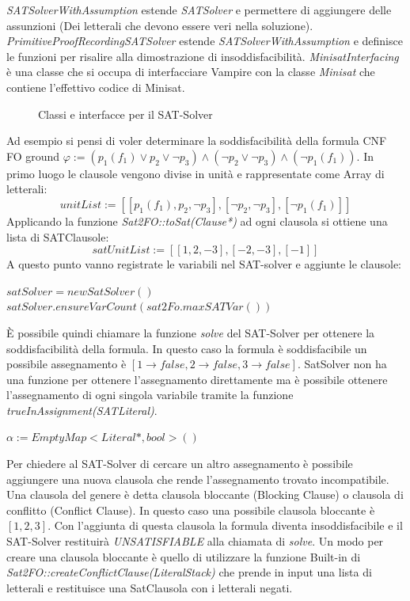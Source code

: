 \documentclass[./main.tex]{subfiles}
\begin{document}
\textit{SATSolverWithAssumption} estende \textit{SATSolver} e permettere di aggiungere delle assunzioni (Dei letterali che devono essere veri nella soluzione).
\textit{PrimitiveProofRecordingSATSolver} estende \textit{SATSolverWithAssumption} e definisce le funzioni per risalire alla dimostrazione di insoddisfacibilità.
\textit{MinisatInterfacing} è una classe che si occupa di interfacciare Vampire con la classe \textit{Minisat} che contiene
l'effettivo codice di Minisat.

\begin{figure}[h]
    \centering
    \scalebox{0.5}{
        
    }
    \caption{Classi e interfacce per il SAT-Solver}
    \label{fig:vampire_sat_solver}
\end{figure}

Ad esempio si pensi di voler determinare la soddisfacibilità della formula CNF FO ground 
$\varphi := (p_1(f_1) \lor p_2 \lor \lnot p_3) \land (\lnot p_2 \lor \lnot p_3) \land (\lnot p_1(f_1))$.
In primo luogo le clausole vengono divise in unità e rappresentate come Array di letterali:
$$unitList := [[p_1(f_1), p_2, \lnot p_3], [\lnot p_2, \lnot p_3], [\lnot p_1(f_1)]]$$
Applicando la funzione \textit{Sat2FO::toSat(Clause*)} ad ogni clausola si ottiene una lista di SATClausole:
$$satUnitList := [[1, 2, -3], [-2, -3], [-1]]$$
A questo punto vanno registrate le variabili nel SAT-solver e aggiunte le clausole:

$satSolver = new SatSolver()$ \\
$satSolver.ensureVarCount(sat2Fo.maxSATVar())$ \\

È possibile quindi chiamare la funzione \textit{solve} del SAT-Solver per ottenere la soddisfacibilità della formula.
In questo caso la formula è soddisfacibile un possibile assegnamento è $[1{\rightarrow}false, 2{\rightarrow}false, 3{\rightarrow}false]$.
SatSolver non ha una funzione per ottenere l'assegnamento direttamente ma è possibile ottenere l'assegnamento di ogni singola variabile
tramite la funzione \textit{trueInAssignment(SATLiteral)}.

$\alpha := EmptyMap<Literal*, bool>()$ \\


Per chiedere al SAT-Solver di cercare un altro assegnamento è possibile aggiungere una nuova clausola 
che rende l'assegnamento trovato incompatibile. Una clausola del genere è detta clausola bloccante (Blocking Clause) o clausola di conflitto (Conflict Clause).
In questo caso una possibile clausola bloccante è $[1,2,3]$. 
Con l'aggiunta di questa clausola la formula diventa insoddisfacibile e il SAT-Solver restituirà \textit{UNSATISFIABLE} alla chiamata di \textit{solve}.
Un modo per creare una clausola bloccante è quello di utilizzare la funzione Built-in di \textit{Sat2FO::createConflictClause(LiteralStack)}
che prende in input una lista di letterali e restituisce una SatClausola con i letterali negati.
\end{document}
